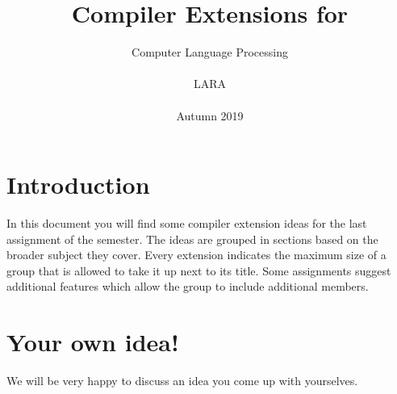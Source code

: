 \documentclass[]{article}
\title{Compiler Extensions for \langname}
\date{Computer Language Processing\\~\\LARA\\~\\Autumn 2019}
\begin{document}
\maketitle

\section{Introduction}
In this document you will find some compiler extension ideas
for the last assignment of the semester.
The ideas are grouped in sections based on the broader subject they cover.
Every extension indicates the maximum size of a
group that is allowed to take it up next to its title.
Some assignments suggest additional features which allow the group to include
additional members.

\section{Your own idea!}
We will be very happy to discuss an idea you come up with yourselves.





\end{document}
